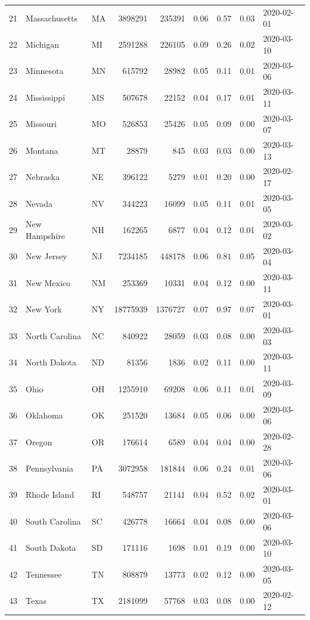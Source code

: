 \documentclass[12pt,a4paper]{article}
\begin{document}
\begin{table}[H]
{\begin{tabular}{rllrrrrrl}
		21 & Massachusetts & MA & 3898291 & 235391 & 0.06 & 0.57 & 0.03 & 2020-02-01 \\ 
		22 & Michigan & MI & 2591288 & 226105 & 0.09 & 0.26 & 0.02 & 2020-03-10 \\ 
		23 & Minnesota & MN & 615792 & 28982 & 0.05 & 0.11 & 0.01 & 2020-03-06 \\ 
		24 & Mississippi & MS & 507678 & 22152 & 0.04 & 0.17 & 0.01 & 2020-03-11 \\ 
		25 & Missouri & MO & 526853 & 25426 & 0.05 & 0.09 & 0.00 & 2020-03-07 \\ 
		26 & Montana & MT & 28879 & 845 & 0.03 & 0.03 & 0.00 & 2020-03-13 \\ 
		27 & Nebraska & NE & 396122 & 5279 & 0.01 & 0.20 & 0.00 & 2020-02-17 \\ 
		28 & Nevada & NV & 344223 & 16099 & 0.05 & 0.11 & 0.01 & 2020-03-05 \\ 
		29 & New Hampshire & NH & 162265 & 6877 & 0.04 & 0.12 & 0.01 & 2020-03-02 \\ 
		30 & New Jersey & NJ & 7234185 & 448178 & 0.06 & 0.81 & 0.05 & 2020-03-04 \\ 
		31 & New Mexico & NM & 253369 & 10331 & 0.04 & 0.12 & 0.00 & 2020-03-11 \\ 
		32 & New York & NY & 18775939 & 1376727 & 0.07 & 0.97 & 0.07 & 2020-03-01 \\ 
		33 & North Carolina & NC & 840922 & 28059 & 0.03 & 0.08 & 0.00 & 2020-03-03 \\ 
		34 & North Dakota & ND & 81356 & 1836 & 0.02 & 0.11 & 0.00 & 2020-03-11 \\ 
		35 & Ohio & OH & 1255910 & 69208 & 0.06 & 0.11 & 0.01 & 2020-03-09 \\ 
		36 & Oklahoma & OK & 251520 & 13684 & 0.05 & 0.06 & 0.00 & 2020-03-06 \\ 
		37 & Oregon & OR & 176614 & 6589 & 0.04 & 0.04 & 0.00 & 2020-02-28 \\ 
		38 & Pennsylvania & PA & 3072958 & 181844 & 0.06 & 0.24 & 0.01 & 2020-03-06 \\ 
		39 & Rhode Island & RI & 548757 & 21141 & 0.04 & 0.52 & 0.02 & 2020-03-01 \\ 
		40 & South Carolina & SC & 426778 & 16664 & 0.04 & 0.08 & 0.00 & 2020-03-06 \\ 
		41 & South Dakota & SD & 171116 & 1698 & 0.01 & 0.19 & 0.00 & 2020-03-10 \\ 
		42 & Tennessee & TN & 808879 & 13773 & 0.02 & 0.12 & 0.00 & 2020-03-05 \\ 
		43 & Texas & TX & 2181099 & 57768 & 0.03 & 0.08 & 0.00 & 2020-02-12 \\ 

\end{tabular}}
\end{table}
\end{document}
